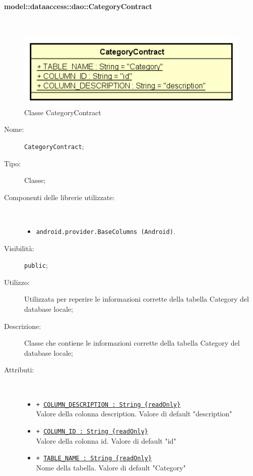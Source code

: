 \documentclass[../DefinizioneDiProdotto.tex]{subfiles}
\begin{document}
\paragraph{model::dataaccess::dao::CategoryContract}
\
\begin{figure}[H]
	\centering
	\includegraphics[width=\maxwidth]{img/CategoryContract.png}
	\caption{Classe CategoryContract}\label{fig:model::dataaccess::dao::CategoryContract} 
\end{figure}
\begin{description}
	\item[Nome:] \texttt{CategoryContract};
	\item[Tipo:] Classe;
	\item[Componenti delle librerie utilizzate:] \
	\begin{itemize}
		\item \texttt{android.provider.BaseColumns (Android)}.
		
	\end{itemize}
	\item[Visibilità:] \texttt{public};
	\item[Utilizzo:] Utilizzata per reperire le informazioni corrette della tabella Category del database locale;
	\item[Descrizione:] Classe che contiene le informazioni corrette della tabella Category del database locale;
	\item[Attributi:] \
	\begin{itemize}
		\item \texttt{+ \underline{COLUMN\_DESCRIPTION : String \{readOnly\}}}\\
		Valore della colonna description. Valore di default "description"
		
		\item \texttt{+ \underline{COLUMN\_ID : String \{readOnly\}}}\\
		Valore della colonna id. Valore di default "id"
		
		\item \texttt{+ \underline{TABLE\_NAME : String \{readOnly\}}}\\
		Nome della tabella. Valore di default "Category"
		
	\end{itemize}
\end{description}
\end{document}
